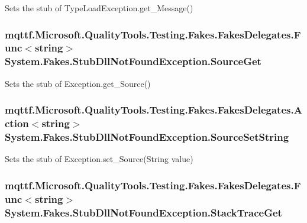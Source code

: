 Sets the stub of Type\-Load\-Exception.\-get\-\_\-\-Message()

\hypertarget{class_system_1_1_fakes_1_1_stub_dll_not_found_exception_a91d9cbe55ccff3c8007bfc6202887dfa}{
\subsubsection[{Source\-Get}]{\setlength{\rightskip}{0pt plus 5cm}mqttf.\-Microsoft.\-Quality\-Tools.\-Testing.\-Fakes.\-Fakes\-Delegates.\-Func$<$string$>$ System.\-Fakes.\-Stub\-Dll\-Not\-Found\-Exception.\-Source\-Get}}\label{class_system_1_1_fakes_1_1_stub_dll_not_found_exception_a91d9cbe55ccff3c8007bfc6202887dfa}


Sets the stub of Exception.\-get\-\_\-\-Source()

\hypertarget{class_system_1_1_fakes_1_1_stub_dll_not_found_exception_a5df90bbd720b9ed5d432ae38ca2e9ad5}{
\subsubsection[{Source\-Set\-String}]{\setlength{\rightskip}{0pt plus 5cm}mqttf.\-Microsoft.\-Quality\-Tools.\-Testing.\-Fakes.\-Fakes\-Delegates.\-Action$<$string$>$ System.\-Fakes.\-Stub\-Dll\-Not\-Found\-Exception.\-Source\-Set\-String}}\label{class_system_1_1_fakes_1_1_stub_dll_not_found_exception_a5df90bbd720b9ed5d432ae38ca2e9ad5}


Sets the stub of Exception.\-set\-\_\-\-Source(\-String value)

\hypertarget{class_system_1_1_fakes_1_1_stub_dll_not_found_exception_a3c99bd6b1ac629eb9d9e4ad8aec4ccd0}{
\subsubsection[{Stack\-Trace\-Get}]{\setlength{\rightskip}{0pt plus 5cm}mqttf.\-Microsoft.\-Quality\-Tools.\-Testing.\-Fakes.\-Fakes\-Delegates.\-Func$<$string$>$ System.\-Fakes.\-Stub\-Dll\-Not\-Found\-Exception.\-Stack\-Trace\-Get}}\label{class_system_1_1_fakes_1_1_stub_dll_not_found_exception_a3c99bd6b1ac629eb9d9e4ad8aec4ccd0}


